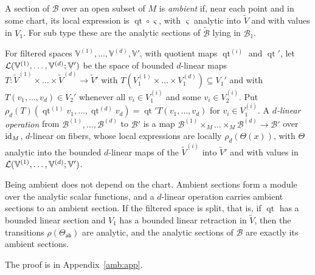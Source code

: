 \begin{definition}\label{amb:def:section}
A section of $\mathcal B$ over an open subset of $M$ is \emph{ambient} if, near each point and in some chart, its local expression is $\operatorname{qt}\circ\varsigma$, with $\varsigma$ analytic into $\tilde V$ and with values in $V_1$. For sub type these are the analytic sections of $\widetilde{\mathcal B}$ lying in $\mathcal B_1$.

For filtered spaces $\mathbb V^{(1)},\dots,\mathbb V^{(d)},\mathbb V'$, with quotient maps $\operatorname{qt}^{(i)}$ and $\operatorname{qt}'$, let $\mathcal L(\mathbb V^{(1)},\dots,\mathbb V^{(d)};\mathbb V')$ be the space of bounded $d$-linear maps $T\colon\tilde V^{(1)}\times\dots\times\tilde V^{(d)}\to\tilde V'$ with $T(V^{(1)}_1\times\dots\times V^{(d)}_1)\subseteq V_1'$ and with $T(v_1,\dots,v_d)\in V_2'$ whenever all $v_i\in V^{(i)}_1$ and some $v_i\in V^{(i)}_2$. Put $\rho_d(T)(\operatorname{qt}^{(1)}v_1,\dots,\operatorname{qt}^{(d)}v_d)=\operatorname{qt}'T(v_1,\dots,v_d)$ for $v_i\in V^{(i)}_1$. A \emph{$d$-linear operation} from $\mathcal B^{(1)},\dots,\mathcal B^{(d)}$ to $\mathcal B'$ is a map $\mathcal B^{(1)}\times_M\dots\times_M\mathcal B^{(d)}\to\mathcal B'$ over $\mathrm{id}_M$, $d$-linear on fibers, whose local expressions are locally $\rho_d(\Theta(x))$, with $\Theta$ analytic into the bounded $d$-linear maps of the $\tilde V^{(i)}$ into $\tilde V'$ and with values in $\mathcal L(\mathbb V^{(1)},\dots,\mathbb V^{(d)};\mathbb V')$.
\end{definition}

\begin{proposition}\label{amb:prop:sections}
Being ambient does not depend on the chart. Ambient sections form a module over the analytic scalar functions, and a $d$-linear operation carries ambient sections to an ambient section. If the filtered space is split, that is, if $\operatorname{qt}$ has a bounded linear section and $V_1$ has a bounded linear retraction in $\tilde V$, then the transitions $\rho(\Theta_{\mathsf{ab}})$ are analytic, and the analytic sections of $\mathcal B$ are exactly its ambient sections.
\end{proposition}

The proof is in Appendix~\ref{amb:app}.

